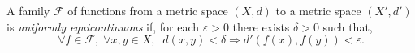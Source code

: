 \documentclass[12pt]{article}
\begin{document}
A family $\mathcal{F}$ of functions from a metric space $(X,d)$ to a metric space $(X',d')$ is \emph{uniformly equicontinuous} if, for each $\varepsilon>0$ there exists $\delta>0$ such that, 
\[\forall f\in\mathcal{F},\; \forall x,y\in X,\;\; d(x,y)<\delta \Rightarrow d'(f(x),f(y))<\varepsilon.\]
\end{document}
